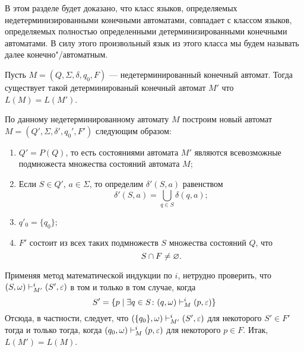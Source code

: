 В этом разделе будет доказано, что класс языков, определяемых недетерминизированными конечными автоматами, совпадает с классом языков, определяемых полностью определенными детерминизированными конечными автоматами. В силу этого произвольный язык из этого класса мы будем называть далее конечно"/автоматным.

\begin{mytheorem}
\label{theorem-reduction-NKAtoDKA}
Пусть $M=(Q,\Sigma,\delta,q_0,F)$ --- недетерминированный конечный автомат. Тогда существует такой детерминированый конечный автомат $M'$ что $L(M) = L(M')$.
\end{mytheorem}

\begin{myproof}
По данному недетерминированному автомату $M$ построим новый автомат $M=(Q',\Sigma,\delta ',q_0',F')$ следующим образом:
\begin{enumerate}
\item $Q'=P(Q)$, то есть состояниями автомата $M'$ являются всевозможные подмножеста множества состояний автомата $M$;
\item Если $S\in Q'$, $a\in\Sigma$, то определим $\delta '(S,a)$ равенством
\[
	\delta '(S,a) = \bigcup_{q\in S} \delta(q,a);
\]

\item $q'_0=\{q_0\}$;

\item $F'$ состоит из всех таких подмножеств $S$ множества состояний $Q$, что \[
	S\cap F\neq\varnothing.
\]
\end{enumerate}
Применяя метод математической индукции по $i$, нетрудно проверить, что $(S,\omega)\vdash_{M'}^i(S',\varepsilon)$ в том и только в том случае, когда
\[
S'=\{p\mid\exists q\in S\colon (q,\omega)\vdash_M^i(p,\varepsilon)\}
\]
Отсюда, в частности, следует, что $(\{q_0\},\omega)\vdash_{M'}^i(S',\varepsilon)$ для некоторого $S'\in F'$ тогда и только тогда, когда $(q_0,\omega)\vdash_M^i(p,\varepsilon)$ для некоторого $p\in F$. Итак, $L(M')=L(M)$.
\end{myproof}

